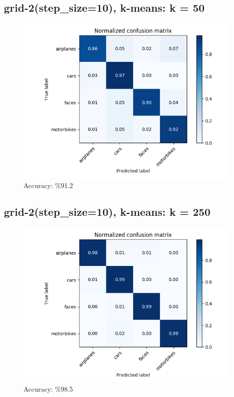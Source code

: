 \subsection*{grid-2(step\_size=10), k-means: k = 50}
\begin{figure}[H]
    \centering
    \includegraphics[scale = 0.45]{images/confusion-stp-10-50.png}
    \caption*{Accuracy: \%91.2}
\end{figure}

\subsection*{grid-2(step\_size=10), k-means: k = 250}
\begin{figure}[H]
    \centering
    \includegraphics[scale = 0.45]{images/confusion-stp-10-250.png}
    \caption*{Accuracy: \%98.5}
\end{figure}

